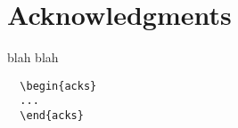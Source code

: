 \section{Acknowledgments}
 blah blah
\begin{verbatim}
  \begin{acks}
  ...
  \end{acks}
\end{verbatim}